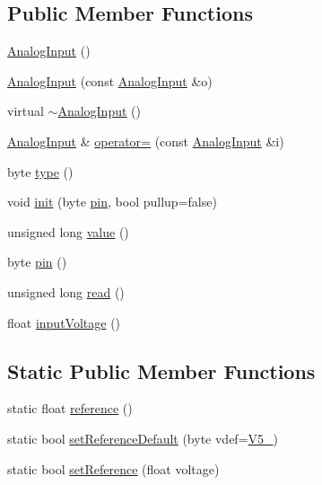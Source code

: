 \subsection*{Public Member Functions}
\begin{DoxyCompactItemize}
\item 
\hyperlink{classsmrtobj_1_1io_1_1_analog_input_a40008473025615c63d22cf82091f1c49}{Analog\+Input} ()
\item 
\hyperlink{classsmrtobj_1_1io_1_1_analog_input_a3cf704d9977129fc9548f4d10d344dcc}{Analog\+Input} (const \hyperlink{classsmrtobj_1_1io_1_1_analog_input}{Analog\+Input} \&o)
\item 
virtual \hyperlink{classsmrtobj_1_1io_1_1_analog_input_a663423c6a8c4556498b8b7c15ad2f163}{$\sim$\+Analog\+Input} ()
\item 
\hyperlink{classsmrtobj_1_1io_1_1_analog_input}{Analog\+Input} \& \hyperlink{classsmrtobj_1_1io_1_1_analog_input_a98027675f727183bc289d5276eb1f38e}{operator=} (const \hyperlink{classsmrtobj_1_1io_1_1_analog_input}{Analog\+Input} \&i)
\item 
byte \hyperlink{classsmrtobj_1_1io_1_1_analog_input_a08fe1be7aca445768e1b2293cb48b96a}{type} ()
\item 
void \hyperlink{classsmrtobj_1_1io_1_1_analog_input_a05e6a75658d9c5d9c5b9cbfffb8e2a91}{init} (byte \hyperlink{classsmrtobj_1_1io_1_1_analog_input_a5768f6b56a7ad5b9eb7da2b95951d5e6}{pin}, bool pullup=false)
\item 
unsigned long \hyperlink{classsmrtobj_1_1io_1_1_analog_input_aa223ad3c6350b5f94f8563870134f4e3}{value} ()
\item 
byte \hyperlink{classsmrtobj_1_1io_1_1_analog_input_a5768f6b56a7ad5b9eb7da2b95951d5e6}{pin} ()
\item 
unsigned long \hyperlink{classsmrtobj_1_1io_1_1_analog_input_aed112dc7b72d12075c93a5ca29a661f7}{read} ()
\item 
float \hyperlink{classsmrtobj_1_1io_1_1_analog_input_a99054ad9e24ffa6d1f2d5832ff3ad640}{input\+Voltage} ()
\end{DoxyCompactItemize}
\subsection*{Static Public Member Functions}
\begin{DoxyCompactItemize}
\item 
static float \hyperlink{classsmrtobj_1_1io_1_1_analog_input_a71d194e2abf9852b8ac5d0750568be4c}{reference} ()
\item 
static bool \hyperlink{classsmrtobj_1_1io_1_1_analog_input_aec6587007c8d16a2483e22fbf621631e}{set\+Reference\+Default} (byte vdef=\hyperlink{classsmrtobj_1_1io_1_1_analog_input_a4e2bf85b374d5856fc0dee0225fbd025a2692641238f0ae5eb558d1f9c1688604}{V5\+\_})
\item 
static bool \hyperlink{classsmrtobj_1_1io_1_1_analog_input_a868ba4197c49394a0e0c70bd47ca2074}{set\+Reference} (float voltage)
\end{DoxyCompactItemize}
